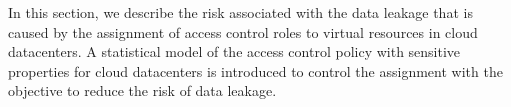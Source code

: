 In this section, we describe the risk associated with the data leakage that is caused by the assignment of access control roles to virtual resources in cloud datacenters. A statistical model of the access control policy with sensitive properties for cloud datacenters is introduced to control the assignment with the objective to reduce the risk of data leakage. 








